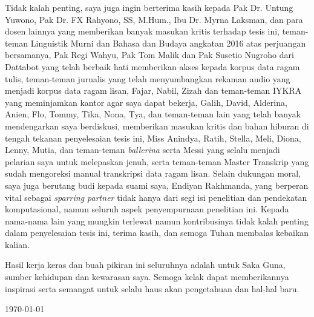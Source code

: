 Tidak kalah penting, saya juga ingin berterima kasih kepada Pak Dr. Untung Yuwono, Pak Dr. FX Rahyono, SS, M.Hum., Ibu Dr. Myrna Laksman, dan para dosen lainnya yang memberikan banyak masukan kritis terhadap tesis ini, teman-teman Linguistik Murni dan Bahasa dan Budaya angkatan 2016 atas perjuangan bersamanya, Pak Regi Wahyu, Pak Tom Malik dan Pak Susetio Nugroho dari Dattabot yang telah berbaik hati memberikan akses kepada korpus data ragam tulis, teman-teman jurnalis yang telah menyumbangkan rekaman audio yang menjadi korpus data ragam lisan, Fajar, Nabil, Zizah dan teman-teman IYKRA yang meminjamkan kantor agar saya dapat bekerja, Galih, David, Alderina, Anien, Flo, Tommy, Tika, Nona, Tya, dan teman-teman lain yang telah banyak mendengarkan saya berdiskusi, memberikan masukan kritis dan bahan hiburan di tengah tekanan penyelesaian tesis ini, Miss Anindya, Ratih, Stella, Meli, Diona, Lenny, Mutia, dan teman-teman \textit{ballerina} serta Messi yang selalu menjadi pelarian saya untuk melepaskan jenuh, serta teman-teman Master Transkrip yang sudah mengoreksi manual transkripsi data ragam lisan. Selain dukungan moral, saya juga berutang budi kepada suami saya, Endiyan Rakhmanda, yang berperan vital sebagai \textit{sparring partner} tidak hanya dari segi isi penelitian dan pendekatan komputasional, namun seluruh aspek penyempurnaan penelitian ini. Kepada nama-nama lain yang mungkin terlewat namun kontribusinya tidak kalah penting dalam penyelesaian tesis ini, terima kasih, dan semoga Tuhan membalas kebaikan kalian.

Hasil kerja keras dan buah pikiran ini seluruhnya adalah untuk Saka Guna, sumber kehidupan dan kewarasan saya. Semoga kelak dapat memberikannya inspirasi serta semangat untuk selalu haus akan pengetahuan dan hal-hal baru.

\vspace*{0.1cm}
\begin{flushright}
\today\\[0.1cm]
\vspace*{1cm}
\penulis

\end{flushright}